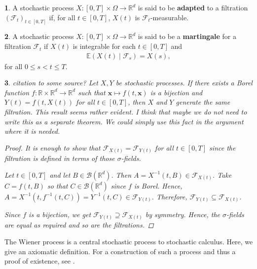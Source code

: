 \documentclass[english]{article}
\newcommand{\comment}[1]{\color{blue}#1\color{black}}
\numberwithin{equation}{section}
\numberwithin{figure}{section}
\theoremstyle{bolddescit}
\newtheorem{theorem}{\protect\theoremname}[section]
\theoremstyle{definition}
\newtheorem{definition}[theorem]{\protect\definitionname}
\theoremstyle{definition}
\theoremstyle{plain}
\theoremstyle{plain}
\theoremstyle{bolddesc}
\theoremstyle{plain}
\theoremstyle{remark}
\providecommand{\definitionname}{Definition}
\providecommand{\theoremname}{Theorem}
\begin{document}
\begin{definition}
  A stochastic process $X : [0,T] \times \Omega \to \mathbb{R}^d$ is said to be \textbf{adapted} to a filtration $(\mathcal{F}_t)_{t \in [0,T]}$ if, for all $t \in [0,T]$, $X(t)$ is $\mathcal{F}_t$-measurable.
\end{definition}

\begin{definition}
  A stochastic process $X : [0,T] \times \Omega \to \mathbb{R}^d$ is said to be a \textbf{martingale} for a filtration $\mathcal{F}_t$ if $X(t)$ is integrable for each $t \in [0,T]$ and
  \begin{align*}
    \mathbb{E}(X(t) \mid \mathcal{F}_s) = X(s),
  \end{align*}
  for all $0 \le s < t \le T$.
\end{definition}

\begin{theorem}\label{thm:bijection-filtration}
\comment{citation to some source?}
  Let $X, Y$ be stochastic processes. If there exists a Borel function $f : \mathbb{R} \times \mathbb{R}^d \to \mathbb{R}^d$ such that $\mathbf{x} \mapsto f(t,\mathbf{x})$ is a bijection and $Y(t) = f(t, X(t))$ for all $t \in [0,T]$, then $X$ and $Y$ generate the same filtration.
\comment{This result seems rather evident. I think that maybe we do not need to write this as a separate theorem. We could simply use this fact in the argument where it is needed.}
  \begin{proof}
    It is enough to show that $\mathcal{F}_{X(t)} = \mathcal{F}_{Y(t)}$ for all $t \in [0,T]$ since the filtration is defined in terms of those $\sigma$-fields.

    Let $t \in [0,T]$ and let $B \in \mathcal{B}(\mathbb{R}^d)$. Then $A = X^{-1}(t,B) \in \mathcal{F}_{X(t)}$. Take $C = f(t, B)$ so that $C \in \mathcal{B}(\mathbb{R}^d)$ since $f$ is Borel. Hence, $A = X^{-1}(t,f^{-1}(t,C)) = Y^{-1}(t,C) \in \mathcal{F}_{Y(t)}$. Therefore, $\mathcal{F}_{Y(t)} \subseteq \mathcal{F}_{X(t)}$.

    Since $f$ is a bijection, we get $\mathcal{F}_{Y(t)} \supseteq \mathcal{F}_{X(t)}$ by symmetry. Hence, the $\sigma$-fields are equal as required and so are the filtrations.
  \end{proof}
\end{theorem}

The Wiener process is a central stochastic process to stochastic calculus. Here, we give an axiomatic definition. For a construction of such a process and thus a proof of existence, see \textcite{capinski_stochastic_2012}.
\end{document}
